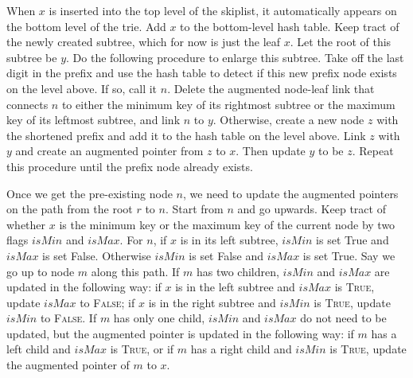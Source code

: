 \documentclass{article}
\begin{document}
When $x$ is inserted into the top level of the skiplist, it automatically appears on the bottom level of the trie. Add $x$ to the bottom-level hash table. Keep tract of the newly created subtree, which for now is just the leaf $x$. Let the root of this subtree be $y$. Do the following procedure to enlarge this subtree. Take off the last digit in the prefix and use the hash table to detect if this new prefix node exists on the level above. If so, call it $n$. Delete the augmented node-leaf link that connects $n$ to either the minimum key of its rightmost subtree or the maximum key of its leftmost subtree, and link $n$ to $y$. Otherwise, create a new node $z$ with the shortened prefix and add it to the hash table on the level above. Link $z$ with $y$ and create an augmented pointer from $z$ to $x$. Then update $y$ to be $z$. Repeat this procedure until the prefix node already exists.

Once we get the pre-existing node $n$, we need to update the augmented pointers on the path from the root $r$ to $n$. Start from $n$ and go upwards. Keep tract of whether $x$ is the minimum key or the maximum key of the current node by two flags $isMin$ and $isMax$. For $n$, if $x$ is in its left subtree, $isMin$ is set True and $isMax$ is set False. Otherwise $isMin$ is set False and $isMax$ is set True. Say we go up to node $m$ along this path. If $m$ has two children, $isMin$ and $isMax$ are updated in the following way: if $x$ is in the left subtree and $isMax$ is \textsc{True}, update $isMax$ to \textsc{False}; if $x$ is in the right subtree and $isMin$ is \textsc{True}, update $isMin$ to \textsc{False}. If $m$ has only one child, $isMin$ and $isMax$ do not need to be updated, but the augmented pointer is updated in the following way: if $m$ has a left child and $isMax$ is \textsc{True}, or if $m$ has a right child and $isMin$ is \textsc{True}, update the augmented pointer of $m$ to $x$.
\end{document}
